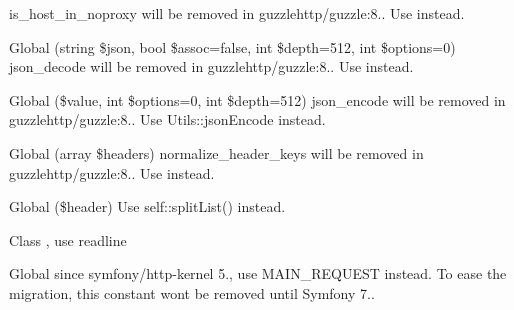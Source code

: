 \begin{DoxyRefList}
%
is\+\_\+host\+\_\+in\+\_\+noproxy will be removed in guzzlehttp/guzzle\+:8.. Use  instead.  
\item[Global \doxylink{namespace_guzzle_http_a876abc2eb3d34a4cfd10abf0f7e3949f}{Guzzle\+Http\+::json\+\_\+decode} (string \$json, bool \$assoc=false, int \$depth=512, int \$options=0)]\label{deprecated__deprecated000042}%
%
json\+\_\+decode will be removed in guzzlehttp/guzzle\+:8.. Use  instead.  
\item[Global \doxylink{namespace_guzzle_http_a43c0826d27653b8c4cd40d2398f4b93e}{Guzzle\+Http\+::json\+\_\+encode} (\$value, int \$options=0, int \$depth=512)]\label{deprecated__deprecated000043}%
%
json\+\_\+encode will be removed in guzzlehttp/guzzle\+:8.. Use Utils\+::json\+Encode instead.  
\item[Global \doxylink{namespace_guzzle_http_a03f26690da8f5472df854b872d19c4dd}{Guzzle\+Http\+::normalize\+\_\+header\+\_\+keys} (array \$headers)]\label{deprecated__deprecated000040}%
%
normalize\+\_\+header\+\_\+keys will be removed in guzzlehttp/guzzle\+:8.. Use  instead.  
\item[Global \doxylink{class_guzzle_http_1_1_psr7_1_1_header_ad63994a240a515477ff53b6e7eb4643f}{Header\+::normalize} (\$header)]\label{deprecated__deprecated000046}%
%
Use self\+::split\+List() instead.  
\item[Class \doxylink{class_psy_1_1_readline_1_1_hoa_console}{Hoa\+Console} ]\label{deprecated__deprecated000270}%
%
, use  readline  
\item[Global \doxylink{interface_symfony_1_1_component_1_1_http_kernel_1_1_http_kernel_interface_a8e278e4b61d87dfee18426aeec907885}{Http\+Kernel\+Interface\+::MASTER\+\_\+\+REQUEST} ]\label{deprecated__deprecated000347}%
%
since symfony/http-\/kernel 5., use MAIN\+\_\+\+REQUEST instead. To ease the migration, this constant won\textquotesingle{}t be removed until Symfony 7..  

\end{DoxyRefList}
